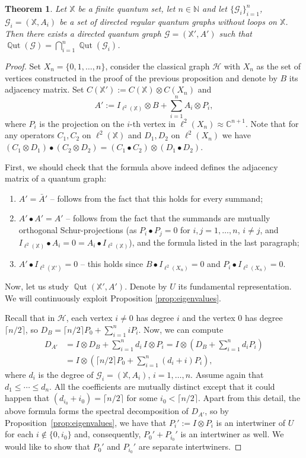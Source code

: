 \documentclass[12pt]{amsart}
\newtheorem{thm}{Theorem}[section]
\theoremstyle{definition}
\theoremstyle{definition}
\theoremstyle{definition}
\theoremstyle{definition}
\DeclareMathOperator{\Qut}{\mathbb{Q}ut}
\newcommand{\I}{{I}}
\newcommand{\X}{\mathbb{X}}
\newcommand{\C}{\mathbb{C}}
\newcommand{\N}{\mathbb{N}}
\newcommand{\Gr}{\mathcal{G}}
\newcommand{\Hr}{\mathcal{H}}
\numberwithin{equation}{section}
\begin{document}
\begin{thm} \label{thm:directed-frucht}
    Let $\X$ be a finite quantum set, let $n \in \N$ and let $\{\Gr_i\}_{i=1}^n$, $\Gr_i=(\X,A_i)$ be a set of directed regular quantum graphs without loops on $\X$. Then there exists a directed quantum graph $\Gr=(\X',A')$ such that $\Qut(\Gr)=\bigcap_{i=1}^n\Qut(\Gr_i)$.
\end{thm}
\begin{proof}
Set $X_n =\{0,1, \ldots, n\}$, consider the classical graph $\Hr$ with $X_n$ as the set of vertices constructed in the proof of the previous proposition and denote by $B$ its adjacency matrix. Set $C(\X'):=C(\X)\otimes C(X_n)$ and
$$A':=\I_{\ell^2(\X)}\otimes B+\sum_{i=1}^n A_i\otimes P_i,$$
where $P_i$ is the projection on the $i$-th vertex in $\ell^2(X_n) \approx \C^{n+1}$. Note that for any operators $C_1, C_2$ on $\ell^2(\X)$ and $D_1, D_2$ on $\ell^2 (X_n) $ we have $(C_1 \otimes D_1) \bullet (C_2 \otimes D_2)
= (C_1 \bullet C_2) \otimes(D_1 \bullet D_2) $.

First, we should check that the formula above indeed defines the adjacency matrix of a quantum graph:
\begin{enumerate}
\item $A'=\bar A'$ -- follows from the fact that this holds for every summand;
\item $A'\bullet A'=A'$ -- follows from the fact that the summands are mutually orthogonal Schur-projections (as $P_i\bullet P_j=0$ for $i, j =1, \ldots, n$, $i \neq j$, and $\I_{\ell^2(\X)}\bullet A_i=0= A_i \bullet \I_{\ell^2(\X)}$), and the formula listed in the last paragraph;
\item $A'\bullet \I_{\ell^2(\X')}  =0$ -- this holds since $B\bullet \I_{\ell^2( X_n)}=0$ and $P_i\bullet \I_{\ell^2(X_n)}=0$.
\end{enumerate}

Now, let us study $\Qut(\X', A')$. Denote by $U$ its fundamental representation. We will continuously exploit Proposition \ref{prop:eigenvalues}.

Recall that in $\Hr$, each vertex $i\neq 0$ has degree $i$ and the vertex 0 has degree $\lceil n/2\rceil$, so $D_B=\lceil n/2\rceil P_0+\sum_{i=1}^n iP_i$. Now, we can compute
\begin{align*}
D_{A'}&=\I\otimes D_B+\sum_{i=1}^n d_i\,\I\otimes P_i=\I\otimes\left(D_B+\sum_{i=1}^n d_iP_i\right)\\
&=\I\otimes\left(\lceil n/2\rceil P_0+\sum_{i=1}^n(d_i+i)P_i\right),
\end{align*}
where $d_i$ is the degree of $\Gr_i=(\X,A_i)$, $i=1, \ldots,n$. Assume again that $d_1\le\cdots\le d_n$. All the coefficients are mutually distinct except that it could happen that $(d_{i_0}+i_0)=\lceil n/2\rceil$ for some $i_0<\lceil n/2\rceil$. Apart from this detail, the above formula forms the spectral decomposition of $D_{A'}$, so by Proposition~\ref{prop:eigenvalues}, we have that $P_i':=\I\otimes P_i$ is an intertwiner of $U$ for each $i\notin \{ 0,i_0\}$ and, consequently, $P_0'+P_{i_0}'$ is an intertwiner as well. We would like to show that $P_0'$ and $P_{i_0}'$ are separate intertwiners.


\end{proof}
\end{document}
